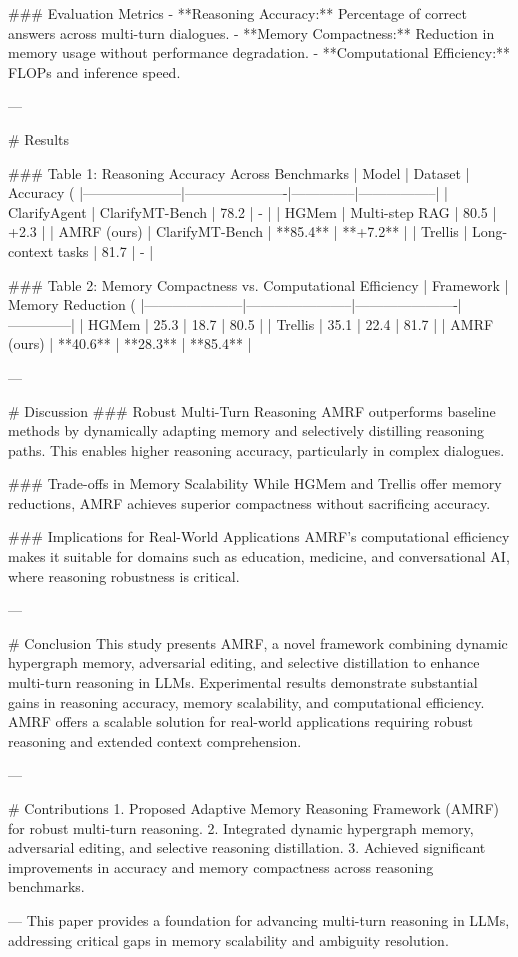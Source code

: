 ### Evaluation Metrics  
- **Reasoning Accuracy:** Percentage of correct answers across multi-turn dialogues.  
- **Memory Compactness:** Reduction in memory usage without performance degradation.  
- **Computational Efficiency:** FLOPs and inference speed.  

---

# Results  

### Table 1: Reasoning Accuracy Across Benchmarks  
| Model               | Dataset              | Accuracy (%
|---------------------|----------------------|--------------|-----------------|  
| ClarifyAgent        | ClarifyMT-Bench     | 78.2         | -               |  
| HGMem               | Multi-step RAG      | 80.5         | +2.3            |  
| AMRF (ours)         | ClarifyMT-Bench     | **85.4**     | **+7.2**        |  
| Trellis             | Long-context tasks  | 81.7         | -               |  

### Table 2: Memory Compactness vs. Computational Efficiency  
| Framework           | Memory Reduction (%
|---------------------|-----------------------|----------------------|--------------|  
| HGMem               | 25.3                 | 18.7                 | 80.5         |  
| Trellis             | 35.1                 | 22.4                 | 81.7         |  
| AMRF (ours)         | **40.6**             | **28.3**             | **85.4**     |  

---

# Discussion  
### Robust Multi-Turn Reasoning  
AMRF outperforms baseline methods by dynamically adapting memory and selectively distilling reasoning paths. This enables higher reasoning accuracy, particularly in complex dialogues.  

### Trade-offs in Memory Scalability  
While HGMem and Trellis offer memory reductions, AMRF achieves superior compactness without sacrificing accuracy.  

### Implications for Real-World Applications  
AMRF's computational efficiency makes it suitable for domains such as education, medicine, and conversational AI, where reasoning robustness is critical.

---

# Conclusion  
This study presents AMRF, a novel framework combining dynamic hypergraph memory, adversarial editing, and selective distillation to enhance multi-turn reasoning in LLMs. Experimental results demonstrate substantial gains in reasoning accuracy, memory scalability, and computational efficiency. AMRF offers a scalable solution for real-world applications requiring robust reasoning and extended context comprehension.  

---

# Contributions  
1. Proposed Adaptive Memory Reasoning Framework (AMRF) for robust multi-turn reasoning.  
2. Integrated dynamic hypergraph memory, adversarial editing, and selective reasoning distillation.  
3. Achieved significant improvements in accuracy and memory compactness across reasoning benchmarks.  

---  
This paper provides a foundation for advancing multi-turn reasoning in LLMs, addressing critical gaps in memory scalability and ambiguity resolution.